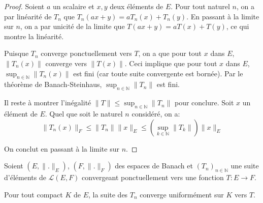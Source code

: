 \begin{proof}
  Soient $a$ un scalaire et $x, y$ deux éléments de $E$. Pour tout
  naturel $n$, on a par linéarité de $T_n$ que
  $T_n(ax + y) = a T_n(x) + T_n(y)$. En passant à la limite sur $n$,
  on a par unicité de la limite que $T(ax + y) = aT(x) + T(y)$, ce qui
  montre la linéarité.

  Puisque $T_n$ converge ponctuellement vers $T$, on a que pour
  tout $x$ dans $E$, $\|T_n(x)\|$ converge vers $\|T(x)\|$. Ceci
  implique que pour tout $x$ dans $E$, $\sup_{n\in\mathbb N} \|T_n(x)\|$
  est fini (car toute suite convergente est bornée). Par le
  théorème de Banach-Steinhaus, $\sup_{n\in\mathbb N}\|T_n\|$ est fini.

  Il reste à montrer l'inégalité $\|T\|\leq \sup_{n\in\mathbb N}\|T_n\|$
  pour conclure. Soit $x$ un élément de $E$. Quel que soit le naturel
  $n$ considéré, on a:
  $$\|T_n(x)\|_F\leq \|T_n\|\|x\|_E\leq
  \left(\sup_{k\in\mathbb N}\|T_k\|\right)\|x\|_E$$

  On conclut en passant à la limite sur $n$.
\end{proof}

\begin{prop}
  Soient $(E, \|.\|_E)$, $(F, \|.\|_F)$ des espaces de Banach et
  $(T_n)_{n\in\mathbb N}$ une suite d'éléments de $\mathscr{L}(E, F)$
  convergeant ponctuellement vers une fonction $T: E\to F$.

  Pour tout compact $K$ de $E$, la suite des $T_n$ converge
  uniformément sur $K$ vers $T$.
\end{prop}

